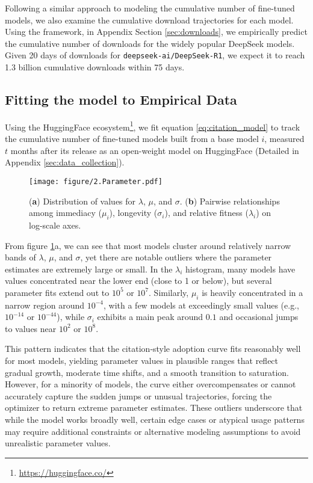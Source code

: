 \documentclass{article} %
\begin{document}
        Following a similar approach to modeling the cumulative number of fine-tuned models, we also examine the cumulative download trajectories for each model. Using the framework, in Appendix Section \ref{sec:downloads}, we empirically predict the cumulative number of downloads for the widely popular DeepSeek models. Given 20 days of downloads for \texttt{deepseek-ai/DeepSeek-R1}, we expect it to reach 1.3 billion cumulative downloads within 75 days.

        \subsection{Fitting the model to Empirical Data}

        Using the HuggingFace ecosystem\footnote{\url{https://huggingface.co/}}, we fit equation \ref{eq:citation_model} to track the cumulative number of fine-tuned models built from a base model $i$, measured $t$ months after its release as an open-weight model on HuggingFace (Detailed in Appendix \ref{sec:data_collection}). 
        
        \begin{figure}[ht]
            \begin{center}
                \texttt{[image: figure/2.Parameter.pdf]}
            \end{center}
            \caption{(\textbf{a}) Distribution of values for $\lambda$, $\mu$, and $\sigma$. (\textbf{b}) Pairwise relationships among immediacy ($\mu_i$), longevity ($\sigma_i$), and relative fitness ($\lambda_i$) on log-scale axes.}
            \label{fig:parameter}
        \end{figure}
        From figure \ref{fig:parameter}a, we can see that most models cluster around relatively narrow bands of $\lambda$, $\mu$, and $\sigma$, yet there are notable outliers where the parameter estimates are extremely large or small. In the $\lambda_i$ histogram, many models have values concentrated near the lower end (close to 1 or below), but several parameter fits extend out to $10^5$ or $10^7$. Similarly, $\mu_i$ is heavily concentrated in a narrow region around $10^{-4}$, with a few models at exceedingly small values (e.g., $10^{-14}$ or $10^{-44}$), while $\sigma_i$ exhibits a main peak around $0.1$ and occasional jumps to values near $10^2$ or $10^8$. 

        This pattern indicates that the citation‐style adoption curve fits reasonably well for most models, yielding parameter values in plausible ranges that reflect gradual growth, moderate time shifts, and a smooth transition to saturation. However, for a minority of models, the curve either overcompensates or cannot accurately capture the sudden jumps or unusual trajectories, forcing the optimizer to return extreme parameter estimates. These outliers underscore that while the model works broadly well, certain edge cases or atypical usage patterns may require additional constraints or alternative modeling assumptions to avoid unrealistic parameter values.
\end{document}
